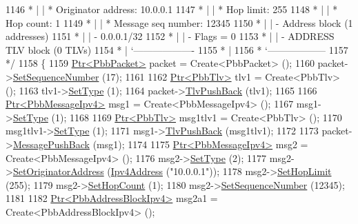 \begin{DoxyCode}
1146 \textcolor{comment}{         * |    | * Originator address: 10.0.0.1}
1147 \textcolor{comment}{         * |    | * Hop limit:          255}
1148 \textcolor{comment}{         * |    | * Hop count:          1}
1149 \textcolor{comment}{         * |    | * Message seq number: 12345}
1150 \textcolor{comment}{         * |    | - Address block (1 addresses)}
1151 \textcolor{comment}{         * |    |     - 0.0.0.1/32}
1152 \textcolor{comment}{         * |    |     - Flags = 0}
1153 \textcolor{comment}{         * |    | - ADDRESS TLV block (0 TLVs)}
1154 \textcolor{comment}{         * |    `-------------------}
1155 \textcolor{comment}{         * |}
1156 \textcolor{comment}{         * `------------------}
1157 \textcolor{comment}{   */}
1158   \{
1159     \hyperlink{classns3_1_1Ptr}{Ptr<PbbPacket>} packet = Create<PbbPacket> ();
1160     packet->\hyperlink{classns3_1_1PbbPacket_a7d6a1602be86109760d0f26ff9bbbb8e}{SetSequenceNumber} (17);
1161 
1162     \hyperlink{classns3_1_1Ptr}{Ptr<PbbTlv>} tlv1 = Create<PbbTlv> ();
1163     tlv1->\hyperlink{classns3_1_1PbbTlv_a90a0452018ed364ac37c3ad116dd718b}{SetType} (1);
1164     packet->\hyperlink{classns3_1_1PbbPacket_a34935793e729a106c176db99c969cb42}{TlvPushBack} (tlv1);
1165 
1166     \hyperlink{classns3_1_1Ptr}{Ptr<PbbMessageIpv4>} msg1 = Create<PbbMessageIpv4> ();
1167     msg1->\hyperlink{classns3_1_1PbbMessage_a4b3d1eaabd3e7412a46ac79bf3360dac}{SetType} (1);
1168 
1169     \hyperlink{classns3_1_1Ptr}{Ptr<PbbTlv>} msg1tlv1 = Create<PbbTlv> ();
1170     msg1tlv1->\hyperlink{classns3_1_1PbbTlv_a90a0452018ed364ac37c3ad116dd718b}{SetType} (1);
1171     msg1->\hyperlink{classns3_1_1PbbMessage_aac70b2672f79765cf5cc5b6666018165}{TlvPushBack} (msg1tlv1);
1172 
1173     packet->\hyperlink{classns3_1_1PbbPacket_a4a3170001ef758d9c9c4375b8f089826}{MessagePushBack} (msg1);
1174 
1175     \hyperlink{classns3_1_1Ptr}{Ptr<PbbMessageIpv4>} msg2 = Create<PbbMessageIpv4> ();
1176     msg2->\hyperlink{classns3_1_1PbbMessage_a4b3d1eaabd3e7412a46ac79bf3360dac}{SetType} (2);
1177     msg2->\hyperlink{classns3_1_1PbbMessage_a52ac135a2bec53db5e8f46b8b8a25e7c}{SetOriginatorAddress} (\hyperlink{classns3_1_1Ipv4Address}{Ipv4Address} (\textcolor{stringliteral}{"10.0.0.1"}));
1178     msg2->\hyperlink{classns3_1_1PbbMessage_a532a7e5e135f7491f8a84ab1dfadd28f}{SetHopLimit} (255);
1179     msg2->\hyperlink{classns3_1_1PbbMessage_a882ec7e2e9a9dff6297152c196d54ce4}{SetHopCount} (1);
1180     msg2->\hyperlink{classns3_1_1PbbMessage_a8c24696ac67507afa03c9750daccc47d}{SetSequenceNumber} (12345);
1181 
1182     \hyperlink{classns3_1_1Ptr}{Ptr<PbbAddressBlockIpv4>} msg2a1 = Create<PbbAddressBlockIpv4> ();

\end{DoxyCode}
